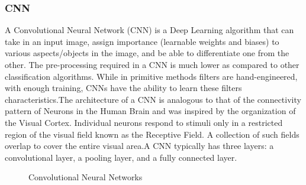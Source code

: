         \subsubsection{CNN}
            A Convolutional Neural Network (CNN) \cite{oshea2015introduction} is a Deep Learning algorithm
            that can take in an input image, assign importance (learnable weights and biases) to various aspects/objects in the image, and be able to differentiate one from the other. The pre-processing required in a CNN is much lower as compared to other classification algorithms. While in primitive methods filters are hand-engineered, with enough training, CNNs have the ability to learn these filters characteristics.The architecture of a CNN is analogous to that of the connectivity pattern of Neurons in the Human Brain and was inspired by the organization of the Visual Cortex. Individual neurons respond to stimuli only in a restricted region of the visual field known as the Receptive Field. A collection of such fields overlap to cover the entire visual area.A CNN typically has three layers: a convolutional layer, a pooling layer, and a fully connected layer.

        \begin{figure}[hbt!]
                \caption{Convolutional Neural Networks} \cite{E1ICAW_2018_v16n3_173}
        \end{figure}

        \newpage
